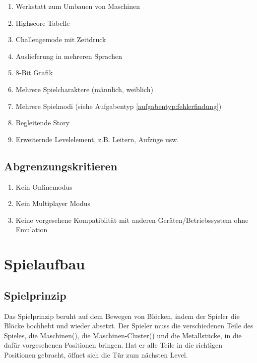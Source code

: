 \documentclass{scrartcl}
\begin{document}
\begin{enumerate}
	\item \label{wunsch:werkstatt}Werkstatt zum Umbauen von Maschinen
	\item \label{wunsch:highscore}Highscore-Tabelle
	\item \label{wunsch:challengemode}Challengemode mit Zeitdruck
	\item \label{wunsch:multilang}Auslieferung in mehreren Sprachen
	\item \label{wunsch:8bit}8-Bit Grafik
	\item \label{wunsch:multiplechar}Mehrere Spielcharaktere (männlich, weiblich)
	\item \label{wunsch:multiplemode}Mehrere Spielmodi (siehe Aufgabentyp \ref{aufgabentyp:fehlerfindung})
    \item \label{wunsch:story}Begleitende Story
    \item \label{wunsch:erweiterndeLevelelemente}Erweiternde Levelelement, z.B. Leitern, Aufzüge usw.
\end{enumerate}

\subsection{Abgrenzungskritieren}

\begin{enumerate}
	\item Kein Onlinemodus
	\item Kein Multiplayer Modus
	\item Keine vorgesehene Kompatiblität mit anderen Geräten/Betriebssystem ohne Emulation
\end{enumerate}

\clearpage











\section{Spielaufbau}

\subsection{Spielprinzip}
Das Spielprinzip beruht auf dem Bewegen von Blöcken, indem der Spieler die Blöcke hochhebt und wieder absetzt. Der Spieler muss die verschiedenen Teile des Spieles, die Maschinen(), die Maschinen-Cluster() und die Metallstücke, in die dafür vorgesehenen Positionen bringen. Hat er alle Teile in die richtigen Positionen gebracht, öffnet sich die Tür zum nächsten Level.
\end{document}
